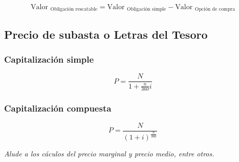 \documentclass[11pt, a4paper]{article}
\begin{document}
\begin{tcolorbox}[colframe=blue!50, colback=blue!5, sharp corners] %
    \begin{equation}
        \text{Valor }_{\text{Obligación rescatable}} = \text{Valor }_{\text{Obligación simple}} - \text{Valor }_{\text{Opción de compra}}
    \end{equation}
\end{tcolorbox}

\subsection{Precio de subasta o Letras del Tesoro}

\subsubsection{Capitalización simple}

\begin{tcolorbox}[colframe=blue!50, colback=blue!5, sharp corners] %
    \begin{equation}
        P = \frac{N}{1+\frac{n}{360}i}
    \end{equation}
\end{tcolorbox}

\subsubsection{Capitalización compuesta}

\begin{tcolorbox}[colframe=blue!50, colback=blue!5, sharp corners] %
    \begin{equation}
        P = \frac{N}{(1+i)^{\frac{n}{360}}}
    \end{equation}
\end{tcolorbox}

\textit{Alude a los cáculos del precio marginal y precio medio, entre otros.}
\end{document}
